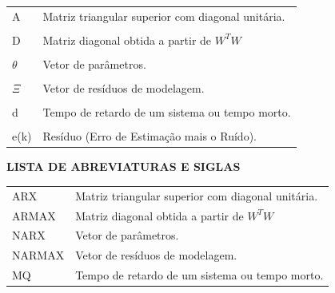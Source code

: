 \documentclass[a4paper,12pt]{article}
\begin{document}
\begin{tabular}{ l l }
A\hspace{1.5cm} & Matriz triangular superior com diagonal unitária.\\
\phantom{a} & \phantom{a}\\
D\hspace{1.5cm} & Matriz diagonal obtida a partir de $W^{T}W$\\
\phantom{a} & \phantom{a}\\
$\theta$\hspace{1.5cm} & Vetor de parâmetros.\\
\phantom{a} & \phantom{a}\\
$\Xi$\hspace{1.5cm} & Vetor de resíduos de modelagem.\\
\phantom{a} & \phantom{a}\\
d\hspace{1.5cm} & Tempo de retardo de um sistema ou tempo morto.\\
\phantom{a} & \phantom{a}\\
e(k)\hspace{1.5cm} & Resíduo (Erro de Estimação mais o Ruído).\\
\end{tabular}

\newpage


\thispagestyle{empty}

\begin{center}
{\large \textbf{LISTA DE ABREVIATURAS E SIGLAS}}
\end{center}

\vspace{3cm}

\begin{tabular}{ l l }
ARX\hspace{1.5cm} & Matriz triangular superior com diagonal unitária.\\
ARMAX\hspace{1.5cm} & Matriz diagonal obtida a partir de $W^{T}W$\\
NARX\hspace{1.5cm}&Vetor de parâmetros.\\
NARMAX\hspace{1.5cm}&Vetor de resíduos de modelagem.\\
MQ\hspace{1.5cm}&Tempo de retardo de um sistema ou tempo morto.\\
\end{tabular}
\end{document}
